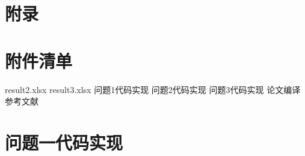 \documentclass{article}
\numberwithin{equation}{subsection}
\begin{document}
\newpage



{\centering\section*{附录}}
\appendix
\section*{附件清单}
\begin{python}
    result2.xlsx
    result3.xlsx
    问题1代码实现
    问题2代码实现
    问题3代码实现
    论文编译
    参考文献
\end{python}    

\section{问题一代码实现}
\end{document}
